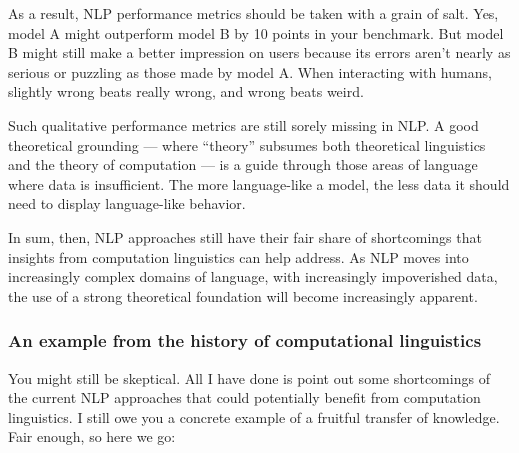 As a result, NLP performance metrics should be taken with a grain of salt.
Yes, model A might outperform model B by 10 points in your benchmark.
But model B might still make a better impression on users because its errors aren't nearly as serious or puzzling as those made by model A\@.
When interacting with humans, slightly wrong beats really wrong, and wrong beats weird.

Such qualitative performance metrics are still sorely missing in NLP.
A good theoretical grounding --- where ``theory'' subsumes both theoretical linguistics and the theory of computation --- is a guide through those areas of language where data is insufficient.
The more language-like a model, the less data it should need to display language-like behavior.

In sum, then, NLP approaches still have their fair share of shortcomings that insights from computation linguistics can help address.
As NLP moves into increasingly complex domains of language, with increasingly impoverished data, the use of a strong theoretical foundation will become increasingly apparent.


\subsubsection{An example from the history of computational linguistics}
\label{sub:formal_arguments_practical_history}

You might still be skeptical.
All I have done is point out some shortcomings of the current NLP approaches that could potentially benefit from computation linguistics.
I still owe you a concrete example of a fruitful transfer of knowledge.
Fair enough, so here we go:

